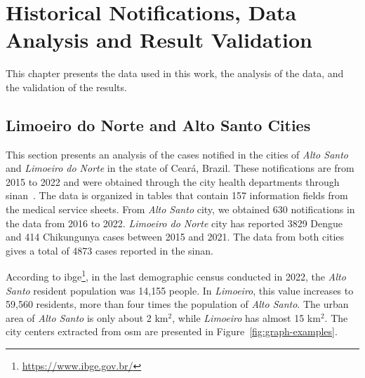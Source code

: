 \chapter{Historical Notifications, Data Analysis and Result Validation} \label{chp:historical-notifications-data-analysis-validation}

This chapter presents the data used in this work, the analysis of the data, and the validation of the results.

\section{Limoeiro do Norte and Alto Santo Cities} \label{sec:real-notifications}

This section presents an analysis of the cases notified in the cities of \textit{Alto Santo} and \textit{Limoeiro do Norte} in the state of Ceará, Brazil. These notifications are from 2015 to 2022 and were obtained through the city health departments through \gls{sinan}~\cite{laguardia:2004}. The data is organized in tables that contain 157 information fields from the medical service sheets. From \textit{Alto Santo} city, we obtained 630 notifications in the data from 2016 to 2022. \textit{Limoeiro do Norte} city has reported 3829 Dengue and 414 Chikungunya cases between 2015 and 2021. The data from both cities gives a total of 4873 cases reported in the \gls{sinan}.

According to \gls{ibge}\footnote{\url{https://www.ibge.gov.br/}}, in the last demographic census conducted in 2022, the \textit{Alto Santo} resident population was 14,155 people. In \textit{Limoeiro}, this value increases to 59,560 residents, more than four times the population of \textit{Alto Santo}. The urban area of \textit{Alto Santo} is only about 2 km$^2$, while \textit{Limoeiro} has almost 15 km$^2$. The city centers extracted from \gls{osm} are presented in Figure~\ref{fig:graph-examples}.

